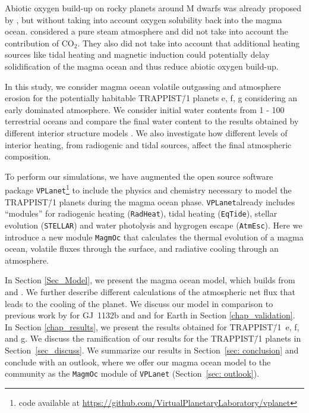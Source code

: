 \documentclass[oneside,twocolumn]{article}
\newcommand{\vplanet}{\texttt{\footnotesize{VPLanet}}}
\newcommand{\atmesc}{\texttt{\footnotesize{AtmEsc}}}
\newcommand{\eqtide}{\texttt{\footnotesize{EqTide}}}
\newcommand{\radheat}{\texttt{\footnotesize{RadHeat}}}
\newcommand{\stellar}{\texttt{\footnotesize{STELLAR}}}
\newcommand{\magmoc}{\texttt{\footnotesize{MagmOc}}}
\newcommand{\eg}{e.g. }
\begin{document}
Abiotic oxygen build-up on rocky planets around M dwarfs was already proposed by \citet{Luger2015a}, but without taking into account oxygen solubility back into the magma ocean.  considered a pure steam atmosphere and did not take into account the contribution of $\mathrm{CO_2}$. They also did not take into account that additional heating sources like tidal heating \citep[\eg][]{Driscoll2015} and magnetic induction \citep{Kislyakova2017} could potentially delay solidification of the magma ocean and thus reduce abiotic oxygen build-up.

In this study, we consider magma ocean volatile outgassing and atmosphere erosion for the potentially habitable TRAPPIST\=/1 planets e, f, g considering an early  dominated atmosphere. We consider initial water contents from 1 - 100 terrestrial oceans and compare the final water content to the results obtained by different interior structure models \citep{Noack2016,barr2018interior,Dorn2018,Unterborn2018b}. We also investigate how different levels of interior heating, from radiogenic and tidal sources, affect the final atmospheric composition.

To perform our simulations, we have augmented the open source software package \vplanet\footnote{code available at \url{https://github.com/VirtualPlanetaryLaboratory/vplanet}} \citep{Barnes2020} to include the physics and chemistry necessary to model the TRAPPIST\=/1 planets during the magma ocean phase. \vplanet already includes ``modules'' for radiogenic heating (\radheat{}), tidal heating (\eqtide{}), stellar evolution (\stellar{}) and water photolysis and hygrogen escape (\atmesc{}). Here we introduce a new module \magmoc{} that calculates the thermal evolution of a magma ocean, volatile fluxes through the surface, and radiative cooling through an  atmosphere.

In Section \ref{Sec_Model}, we present the magma ocean model, which builds from \citet{Schaefer2016} and \citet{Elkins-Tanton2008}. We further describe different calculations of the atmospheric net flux that leads to the cooling of the planet. 
We discuss our model in comparison to previous work by \citet{Schaefer2016} for GJ~1132b and \citet{Elkins-Tanton2008} and \citet{Hamano2013} for Earth in Section \ref{chap_validation}.
In Section \ref{chap_results}, we present the results obtained for TRAPPIST\=/1~e, f, and g. We discuss the ramification of our results for the TRAPPIST\=/1 planets in Section~\ref{sec_discuss}.
We summarize our results in Section~\ref{sec: conclusion} and conclude with an outlook, where we offer our magma ocean model to the community as the \magmoc{} module of \vplanet{}  (Section~\ref{sec: outlook}).
\end{document}
